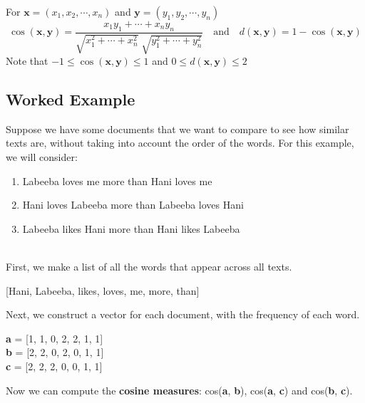\documentclass[11pt,fleqn]{book} %
\begin{document}
\begin{definition}
For $\mathbf{x} = (x_1, x_2, \cdots, x_n)$ and $\mathbf{y} = (y_1, y_2, \cdots, y_n)$
\begin{equation*}
	\cos(\mathbf{x}, \mathbf{y}) = \frac{x_1y_1 + \cdots + x_ny_n}{\sqrt{x_1^2 + \cdots + x_n^2} \; \sqrt{y_1^2 + \cdots + y_n^2}} \quad \text{and} \quad d(\mathbf{x}, \mathbf{y}) = 1 - \cos(\mathbf{x}, \mathbf{y})
\end{equation*}
Note that $-1 \leq \cos(\mathbf{x}, \mathbf{y}) \leq 1$ and $0 \leq d(\mathbf{x}, \mathbf{y}) \leq 2$
\end{definition}

\newpage

\subsection*{Worked Example}
Suppose we have some documents that we want to compare to see how similar texts are, without taking into account the order of the words. For this example, we will consider:\\

\begin{enumerate}[label=(\alph*)]
	\item Labeeba loves me more than Hani loves me
	\item Hani loves Labeeba more than Labeeba loves Hani
	\item Labeeba likes Hani more than Hani likes Labeeba
\end{enumerate}

\ \\ \noindent
First, we make a list of all the words that appear across all texts.
\begin{center}
	[Hani, Labeeba, likes, loves, me, more, than]
\end{center}

\noindent
Next, we construct a vector for each document, with the frequency of each word.
\begin{center}
	\textbf{a} = [1, 1, 0, 2, 2, 1, 1]\\
	\textbf{b} = [2, 2, 0, 2, 0, 1, 1]\\
	\textbf{c} = [2, 2, 2, 0, 0, 1, 1]\\
\end{center}

\noindent
Now we can compute the \textbf{cosine measures}: cos(\textbf{a}, \textbf{b}), cos(\textbf{a}, \textbf{c}) and cos(\textbf{b}, \textbf{c}).
\end{document}
